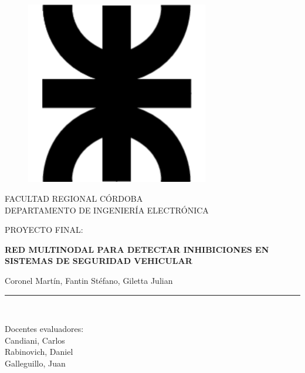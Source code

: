 \documentclass[12pt]{report}
\begin{document}
\begin{titlepage}

    \begin{center}
    \vspace*{-1in}
    \begin{figure}[htb]
    \begin{center}
    \includegraphics[width=8cm]{LogoUTN.png}
    \end{center}
    \end{figure}
    
    FACULTAD REGIONAL CÓRDOBA\\
    \vspace*{0.15in}
    DEPARTAMENTO DE INGENIERÍA ELECTRÓNICA \\
    \vspace*{0.6in}
    \begin{large}
    PROYECTO FINAL:\\
    \end{large}
    \vspace*{0.2in}
    \begin{Large}
    \textbf{RED MULTINODAL PARA DETECTAR INHIBICIONES EN SISTEMAS DE SEGURIDAD VEHICULAR} \\
    \end{Large}
    \vspace*{0.3in}
    \begin{large}
    Coronel Martín, Fantin Stéfano, Giletta Julian\\
    \end{large}
    \vspace*{0.3in}
    \rule{80mm}{0.1mm}\\
    \vspace*{0.1in}
    \begin{large}
    Docentes evaluadores: \\
    Candiani, Carlos\\
    Rabinovich, Daniel\\
    Galleguillo, Juan\\
    \end{large}
    \end{center}
    
\end{titlepage}
\end{document}
